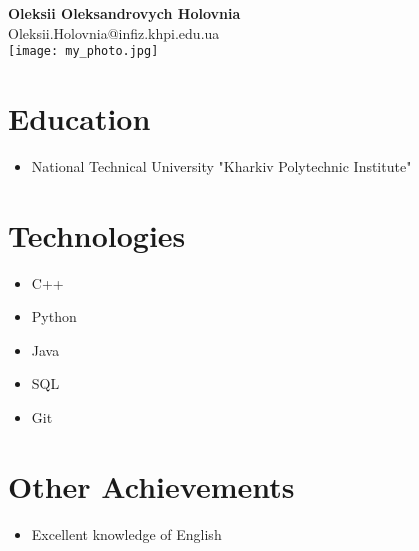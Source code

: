 \documentclass[12pt]{article}
\begin{document}
\begin{center}
   \large{\textbf{Oleksii Oleksandrovych Holovnia}}\\
   \small{Oleksii.Holovnia@infiz.khpi.edu.ua}\\
   \texttt{[image: my\_photo.jpg]}
\end{center}

\section*{Education}
\begin{itemize}
   \item National Technical University "Kharkiv Polytechnic Institute"
\end{itemize}

\section*{Technologies}
\begin{itemize}
   \item C++
   \item Python
   \item Java
   \item SQL
   \item Git
\end{itemize}

\section*{Other Achievements}
\begin{itemize}
   \item Excellent knowledge of English
\end{itemize}
\end{document}
